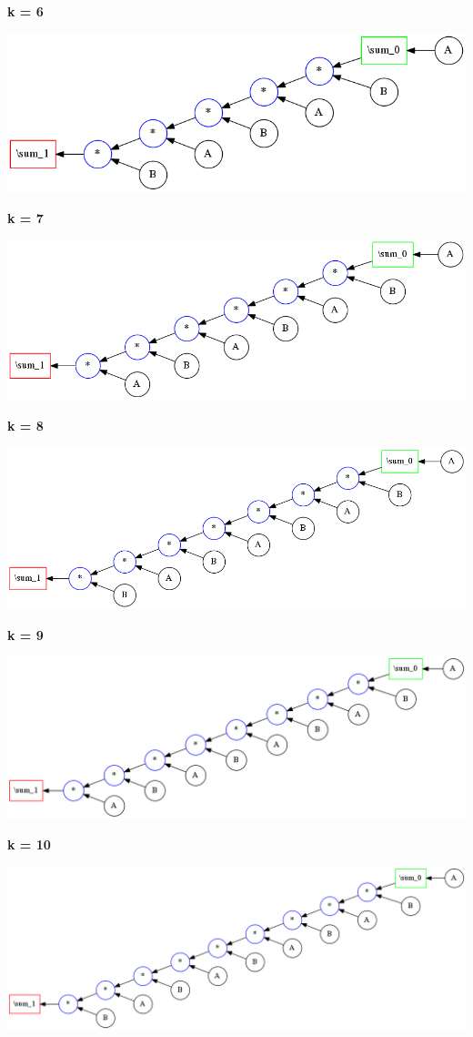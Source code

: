 {\bf k = 6}


\begin{center}
\includegraphics[width=0.45\linewidth]{trees/SumAB_6_horizontal_0.png}
\end{center}


{\bf k = 7}


\begin{center}
\includegraphics[width=0.45\linewidth]{trees/SumAB_7_horizontal_0.png}
\end{center}


{\bf k = 8}


\begin{center}
\includegraphics[width=0.45\linewidth]{trees/SumAB_8_horizontal_0.png}
\end{center}


{\bf k = 9}


\begin{center}
\includegraphics[width=0.45\linewidth]{trees/SumAB_9_horizontal_0.png}
\end{center}


{\bf k = 10}


\begin{center}
\includegraphics[width=0.45\linewidth]{trees/SumAB_10_horizontal_0.png}
\end{center}



